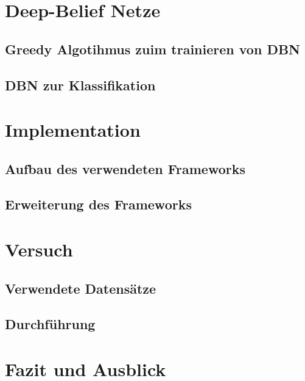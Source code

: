 \documentclass[12pt,titlepage]{beamer}
\begin{document}
	\section{Deep-Belief Netze}
	\subsection{Greedy Algotihmus zuim trainieren von DBN}
	\begin{frame}
	\end{frame}
	\subsection{DBN zur Klassifikation}
	\begin{frame}
	\end{frame}
	\section{Implementation}
	\subsection{Aufbau des verwendeten Frameworks}
	\begin{frame}
	\end{frame}
	\subsection{Erweiterung des Frameworks}
	\begin{frame}
	\end{frame}
	\section{Versuch}
	\subsection{Verwendete Datensätze}
	\begin{frame}
	\end{frame}
	\subsection{Durchführung}
	\begin{frame}
	\end{frame}
	\section{Fazit und Ausblick}
	\begin{frame}
	\end{frame}
	
	
	
	
	
	
	
	

	


	
\end{document}
